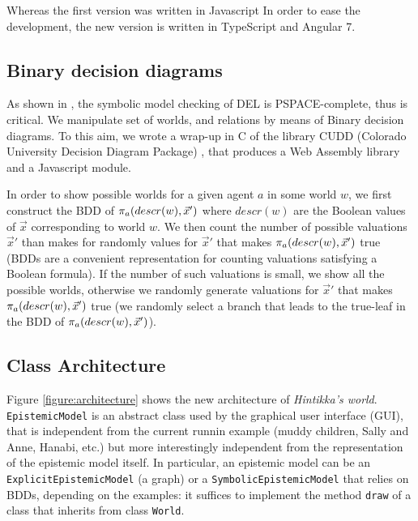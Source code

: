 
Whereas the first version was written in Javascript In order to ease the development, the new version is written in TypeScript and Angular 7.

\subsection{Binary decision diagrams}

As shown in \cite{DBLP:conf/atal/CharrierS17}, the symbolic model checking of DEL is PSPACE-complete, thus is critical. We manipulate set of worlds, and relations by means of Binary decision diagrams. To this aim, we wrote a wrap-up in C of the library CUDD (Colorado University Decision Diagram Package) \cite{DBLP:journals/sttt/Somenzi01}, that produces a Web Assembly library and a Javascript module.

In order to show possible worlds for a given agent $a$ in some world $w$, we first construct the BDD of $\pi_{a}(descr(w), \vec x')$ where $descr(w)$ are the Boolean values of $\vec x$ corresponding to world $w$. We then count the number of possible valuations $\vec x'$ than makes for randomly values for $\vec x'$ that makes $\pi_{a}(descr(w), \vec x')$ true (BDDs are a convenient representation for counting valuations satisfying a Boolean formula). If the number of such valuations is small, we show all the possible worlds, otherwise we randomly generate valuations for $\vec x'$ that makes $\pi_{a}(descr(w), \vec x')$ true (we randomly select a branch that leads to the true-leaf in the BDD of $\pi_{a}(descr(w), \vec x')$).

\subsection{Class Architecture}

Figure \ref{figure:architecture} shows the new architecture of \emph{Hintikka's world}. \texttt{EpistemicModel} is an abstract class used by the graphical user interface (GUI), that is independent from the current runnin example (muddy children, Sally and Anne, Hanabi, etc.) but more interestingly independent from the representation of the epistemic model itself. In particular, an epistemic model can be an \texttt{ExplicitEpistemicModel} (a graph) or a \texttt{SymbolicEpistemicModel} that relies on BDDs, depending on the examples: it suffices to implement the method \texttt{draw} of a class that inherits from class \texttt{World}.


